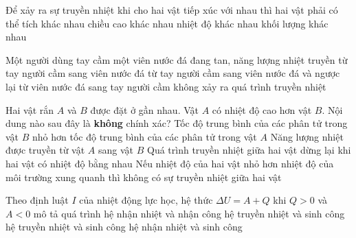 \begin{ex}
Để xảy ra sự truyền nhiệt khi cho hai vật tiếp xúc với nhau thì hai vật phải có
\choice
{thể tích khác nhau}
{chiều cao khác nhau}
{\True nhiệt độ khác nhau}
{khối lượng khác nhau}
\end{ex}

\begin{ex}
Một người dùng tay cầm một viên nước đá đang tan, năng lượng nhiệt truyền
\choice
{\True từ tay người cầm sang viên nước đá}
{từ tay người cầm sang viên nước đá và ngược lại}
{từ viên nước đá sang tay người cầm}
{không xảy ra quá trình truyền nhiệt}
\end{ex}

\begin{ex}
Hai vật rắn $A$ và $B$ được đặt ở gần nhau. Vật $A$ có nhiệt độ cao hơn vật $B$. Nội dung nào sau đây là \textbf{không} chính xác?
\choice
{Tốc độ trung bình của các phân tử trong vật $B$ nhỏ hơn tốc độ trung bình của các phân tử trong vật $A$}
{Năng lượng nhiệt được truyền từ vật $A$ sang vật $B$}
{Quá trình truyền nhiệt giữa hai vật dừng lại khi hai vật có nhiệt độ bằng nhau}
{\True Nếu nhiệt độ của hai vật nhỏ hơn nhiệt độ của môi trường xung quanh thì không có sự truyền nhiệt giữa hai vật}
\end{ex}

\begin{ex}
Theo định luật $I$ của nhiệt động lực học, hệ thức $\Delta U = A + Q$ khi $Q \gt  0$ và $A \lt  0$ mô tả quá trình
\choice
{hệ nhận nhiệt và nhận công}
{hệ truyền nhiệt và sinh công}
{hệ truyền nhiệt và sinh công}
{\True hệ nhận nhiệt và sinh công}
\end{ex}


